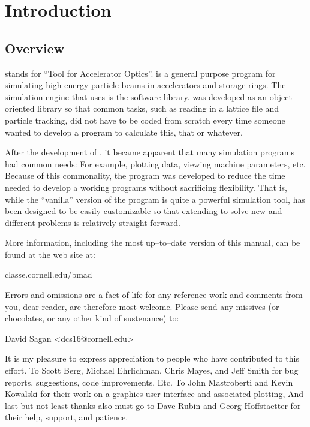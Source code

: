 \chapter{Introduction}
\label{c:introduction}

\section{Overview}
\label{s:overview}

\tao stands for ``Tool for Accelerator Optics''. \tao is a general purpose program for simulating
high energy particle beams in accelerators and storage rings. The simulation engine that \tao uses
is the \bmad software library\cite{b:bmad}. \bmad was developed as an object-oriented library so
that common tasks, such as reading in a lattice file and particle tracking, did not have to be coded
from scratch every time someone wanted to develop a program to calculate this, that or whatever.

After the development of \bmad, it became apparent that many simulation programs had common needs:
For example, plotting data, viewing machine parameters, etc. Because of this commonality, the \tao
program was developed to reduce the time needed to develop a working programs without sacrificing
flexibility. That is, while the ``vanilla'' version of the \tao program is quite a powerful
simulation tool, \tao has been designed to be easily customizable so that extending \tao to solve
new and different problems is relatively straight forward.

More information, including the most up--to--date version of this manual, can be found at the \bmad
web site at:
\begin{example}
  classe.cornell.edu/bmad
\end{example}

Errors and omissions are a fact of life for any reference work and comments from you, dear reader,
are therefore most welcome. Please send any missives (or chocolates, or any other kind of
sustenance) to:
\begin{example}
  David Sagan <dcs16@cornell.edu>
\end{example}

It is my pleasure to express appreciation to people who have contributed to this effort. To Scott
Berg, Michael Ehrlichman, Chris Mayes, and Jeff Smith for bug reports, suggestions, code
improvements, Etc. To John Mastroberti and Kevin Kowalski for their work on a graphics user
interface and associated plotting, And last but not least thanks also must go to Dave Rubin and
Georg Hoffstaetter for their help, support, and patience.

